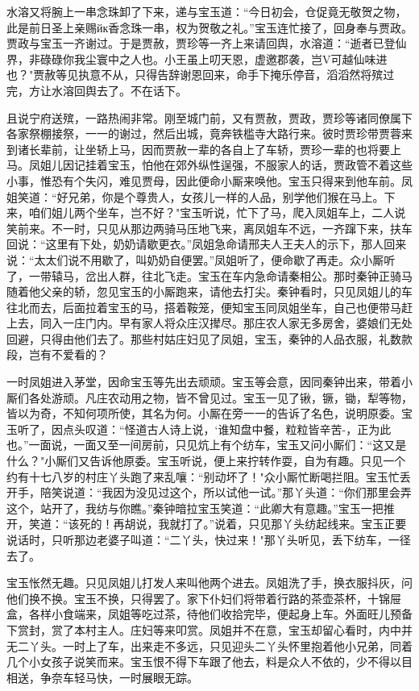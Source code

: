 水溶又将腕上一串念珠卸了下来，递与宝玉道：“今日初会，仓促竟无敬贺之物，此是前日圣上亲赐йк香念珠一串，权为贺敬之礼。”宝玉连忙接了，回身奉与贾政。贾政与宝玉一齐谢过。于是贾赦，贾珍等一齐上来请回舆，水溶道：“逝者已登仙界，非碌碌你我尘寰中之人也。小王虽上叨天恩，虚邀郡袭，岂V可越仙味进也？"贾赦等见执意不从，只得告辞谢恩回来，命手下掩乐停音，滔滔然将殡过完，方让水溶回舆去了。不在话下。

且说宁府送殡，一路热闹非常。刚至城门前，又有贾赦，贾政，贾珍等诸同僚属下各家祭棚接祭，一一的谢过，然后出城，竟奔铁槛寺大路行来。彼时贾珍带贾蓉来到诸长辈前，让坐轿上马，因而贾赦一辈的各自上了车轿，贾珍一辈的也将要上马。凤姐儿因记挂着宝玉，怕他在郊外纵性逞强，不服家人的话，贾政管不着这些小事，惟恐有个失闪，难见贾母，因此便命小厮来唤他。宝玉只得来到他车前。凤姐笑道：“好兄弟，你是个尊贵人，女孩儿一样的人品，别学他们猴在马上。下来，咱们姐儿两个坐车，岂不好？"宝玉听说，忙下了马，爬入凤姐车上，二人说笑前来。不一时，只见从那边两骑马压地飞来，离凤姐车不远，一齐蹿下来，扶车回说：“这里有下处，奶奶请歇更衣。”凤姐急命请邢夫人王夫人的示下，那人回来说：“太太们说不用歇了，叫奶奶自便罢。”凤姐听了，便命歇了再走。众小厮听了，一带辕马，岔出人群，往北飞走。宝玉在车内急命请秦相公。那时秦钟正骑马随着他父亲的轿，忽见宝玉的小厮跑来，请他去打尖。秦钟看时，只见凤姐儿的车往北而去，后面拉着宝玉的马，搭着鞍笼，便知宝玉同凤姐坐车，自己也便带马赶上去，同入一庄门内。早有家人将众庄汉撵尽。那庄农人家无多房舍，婆娘们无处回避，只得由他们去了。那些村姑庄妇见了凤姐，宝玉，秦钟的人品衣服，礼数款段，岂有不爱看的？

一时凤姐进入茅堂，因命宝玉等先出去顽顽。宝玉等会意，因同秦钟出来，带着小厮们各处游顽。凡庄农动用之物，皆不曾见过。宝玉一见了锹，镢，锄，犁等物，皆以为奇，不知何项所使，其名为何。小厮在旁一一的告诉了名色，说明原委。宝玉听了，因点头叹道：“怪道古人诗上说，`谁知盘中餐，粒粒皆辛苦-，正为此也。”一面说，一面又至一间房前，只见炕上有个纺车，宝玉又问小厮们：“这又是什么？"小厮们又告诉他原委。宝玉听说，便上来拧转作耍，自为有趣。只见一个约有十七八岁的村庄丫头跑了来乱嚷：“别动坏了！"众小厮忙断喝拦阻。宝玉忙丢开手，陪笑说道：“我因为没见过这个，所以试他一试。”那丫头道：“你们那里会弄这个，站开了，我纺与你瞧。”秦钟暗拉宝玉笑道：“此卿大有意趣。”宝玉一把推开，笑道：“该死的！再胡说，我就打了。”说着，只见那丫头纺起线来。宝玉正要说话时，只听那边老婆子叫道：“二丫头，快过来！"那丫头听见，丢下纺车，一径去了。

宝玉怅然无趣。只见凤姐儿打发人来叫他两个进去。凤姐洗了手，换衣服抖灰，问他们换不换。宝玉不换，只得罢了。家下仆妇们将带着行路的茶壶茶杯，十锦屉盒，各样小食端来，凤姐等吃过茶，待他们收拾完毕，便起身上车。外面旺儿预备下赏封，赏了本村主人。庄妇等来叩赏。凤姐并不在意，宝玉却留心看时，内中并无二丫头。一时上了车，出来走不多远，只见迎头二丫头怀里抱着他小兄弟，同着几个小女孩子说笑而来。宝玉恨不得下车跟了他去，料是众人不依的，少不得以目相送，争奈车轻马快，一时展眼无踪。

